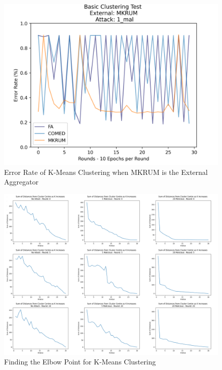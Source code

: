 \begin{figure}[htbp]
	\centering
    \includegraphics[scale=0.5]{my_agg/graphs/cluster_mkrum_1.png}
	\caption{Error Rate of K-Means Clustering when MKRUM is the External Aggregator}
	\label{fig:mkrum_bad}
\end{figure}

\begin{figure}[htbp]
	\centering
    \includegraphics[scale=0.25]{my_agg/graphs/k_elbow.png}
	\caption{Finding the Elbow Point for K-Means Clustering}
	\label{fig:k_elbow}
\end{figure}

